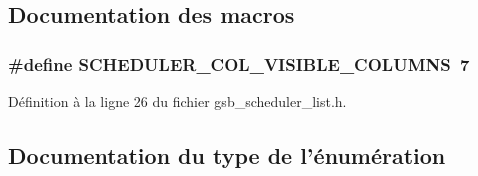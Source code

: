 \subsection{Documentation des macros}
\subsubsection[{SCHEDULER\_\-COL\_\-VISIBLE\_\-COLUMNS}]{\setlength{\rightskip}{0pt plus 5cm}\#define SCHEDULER\_\-COL\_\-VISIBLE\_\-COLUMNS~7}\label{gsb__scheduler__list_8h_af73ad30e2c80f3dc63b6f3495ce5ed26}


Définition à la ligne 26 du fichier gsb\_\-scheduler\_\-list.h.



\subsection{Documentation du type de l'énumération}
